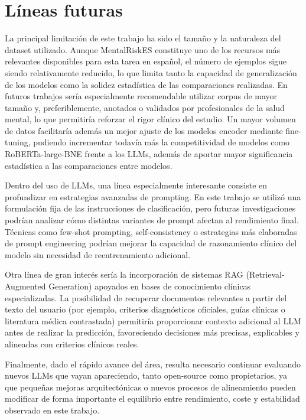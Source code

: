 \section{Líneas futuras}
\label{sec:lineas-futuras}

La principal limitación de este trabajo ha sido el tamaño y la naturaleza del dataset utilizado. Aunque MentalRiskES constituye uno de los recursos más relevantes disponibles para esta tarea en español, el número de ejemplos sigue siendo relativamente reducido, lo que limita tanto la capacidad de generalización de los modelos como la solidez estadística de las comparaciones realizadas. En futuros trabajos sería especialmente recomendable utilizar corpus de mayor tamaño y, preferiblemente, anotados o validados por profesionales de la salud mental, lo que permitiría reforzar el rigor clínico del estudio. Un mayor volumen de datos facilitaría además un mejor ajuste de los modelos encoder mediante fine-tuning, pudiendo incrementar todavía más la competitividad de modelos como RoBERTa-large-BNE frente a los LLMs, además de aportar mayor significancia estadística a las comparaciones entre modelos.

Dentro del uso de LLMs, una línea especialmente interesante consiste en profundizar en estrategias avanzadas de prompting. En este trabajo se utilizó una formulación fija de las instrucciones de clasificación, pero futuras investigaciones podrían analizar cómo distintas variantes de prompt afectan al rendimiento final. Técnicas como few-shot prompting, self-consistency o estrategias más elaboradas de prompt engineering podrían mejorar la capacidad de razonamiento clínico del modelo sin necesidad de reentrenamiento adicional.

Otra línea de gran interés sería la incorporación de sistemas RAG (Retrieval-Augmented Generation) apoyados en bases de conocimiento clínicas especializadas. La posibilidad de recuperar documentos relevantes a partir del texto del usuario (por ejemplo, criterios diagnósticos oficiales, guías clínicas o literatura médica contrastada) permitiría proporcionar contexto adicional al LLM antes de realizar la predicción, favoreciendo decisiones más precisas, explicables y alineadas con criterios clínicos reales.

Finalmente, dado el rápido avance del área, resulta necesario continuar evaluando nuevos LLMs que vayan apareciendo, tanto open-source como propietarios, ya que pequeñas mejoras arquitectónicas o nuevos procesos de alineamiento pueden modificar de forma importante el equilibrio entre rendimiento, coste y estabilidad observado en este trabajo.





